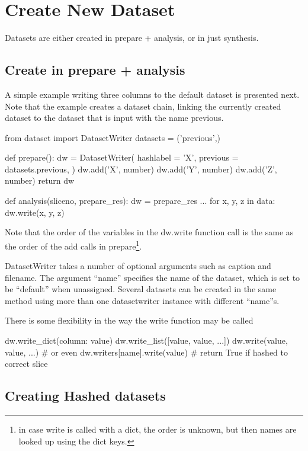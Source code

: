\newpage
\section{Create New Dataset}
Datasets are either created in prepare + analysis, or in just
synthesis.

\subsection{Create in prepare + analysis}
A simple example writing three columns to the default dataset is
presented next.  Note that the example creates a dataset chain,
linking the currently created dataset to the dataset that is input
with the name previous.

\begin{python}
from dataset import DatasetWriter
datasets = ('previous',)

def prepare():
  dw = DatasetWriter(
    hashlabel = 'X',
    previous = datasets.previous,
  )
  dw.add('X', number)
  dw.add('Y', number)
  dw.add('Z', number)
  return dw

def analysis(sliceno, prepare_res):
  dw = prepare_res
  ...
  for x, y, z in data:
    dw.write(x, y, z)
\end{python}
Note that the order of the variables in the dw.write function call is
the same as the order of the add calls in prepare\footnote{in case
  write is called with a dict, the order is unknown, but then names
  are looked up using the dict keys.}.

DatasetWriter takes a number of optional arguments such as caption and
filename.  The argument ``name'' specifies the name of the dataset,
which is set to be ``default'' when unassigned.  Several datasets can
be created in the same method using more than one datasetwriter
instance with different ``name''s.

There is some flexibility in the way the write function may be called

\begin{python}
  dw.write_dict({column: value})
  dw.write_list([value, value, ...])
  dw.write(value, value, ...)
  # or even
  dw.writers[name].write(value)  # return True if hashed to correct slice
\end{python}



\subsection{Creating Hashed datasets}

